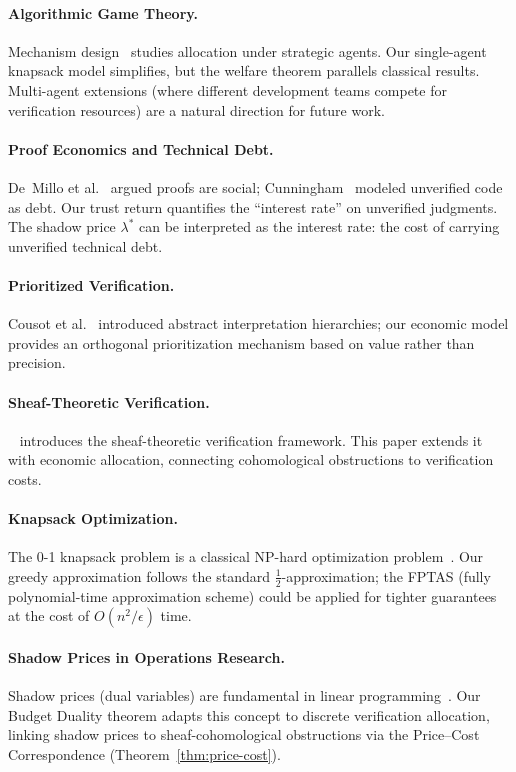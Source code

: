 \documentclass[11pt]{article}
\newcommand{\Shadow}{\lambda}
\begin{document}
\paragraph{Algorithmic Game Theory.}
Mechanism design~\cite{Nisan2007} studies allocation under strategic
agents.  Our single-agent knapsack model simplifies, but the welfare
theorem parallels classical results.  Multi-agent extensions (where
different development teams compete for verification resources) are
a natural direction for future work.

\paragraph{Proof Economics and Technical Debt.}
De~Millo et al.~\cite{DeMillo1979} argued proofs are social;
Cunningham~\cite{Cunningham1992} modeled unverified code as debt.
Our trust return quantifies the ``interest rate'' on unverified
judgments.  The shadow price $\Shadow^*$ can be interpreted as the
interest rate: the cost of carrying unverified technical debt.

\paragraph{Prioritized Verification.}
Cousot et al.~\cite{Cousot1977} introduced abstract interpretation
hierarchies; our economic model provides an orthogonal prioritization
mechanism based on value rather than precision.

\paragraph{Sheaf-Theoretic Verification.}
\JuGeo~\cite{JuGeo2023} introduces the sheaf-theoretic verification
framework.  This paper extends it with economic allocation, connecting
cohomological obstructions to verification costs.

\paragraph{Knapsack Optimization.}
The 0-1 knapsack problem is a classical NP-hard optimization
problem~\cite{MasColell1995}.  Our greedy approximation follows the
standard $\frac{1}{2}$-approximation; the FPTAS (fully polynomial-time
approximation scheme) could be applied for tighter guarantees at the
cost of $O(n^2/\epsilon)$ time.

\paragraph{Shadow Prices in Operations Research.}
Shadow prices (dual variables) are fundamental in linear
programming~\cite{Varian1992}.  Our Budget Duality theorem adapts
this concept to discrete verification allocation, linking shadow
prices to sheaf-cohomological obstructions via the Price--Cost
Correspondence (Theorem~\ref{thm:price-cost}).
\end{document}
